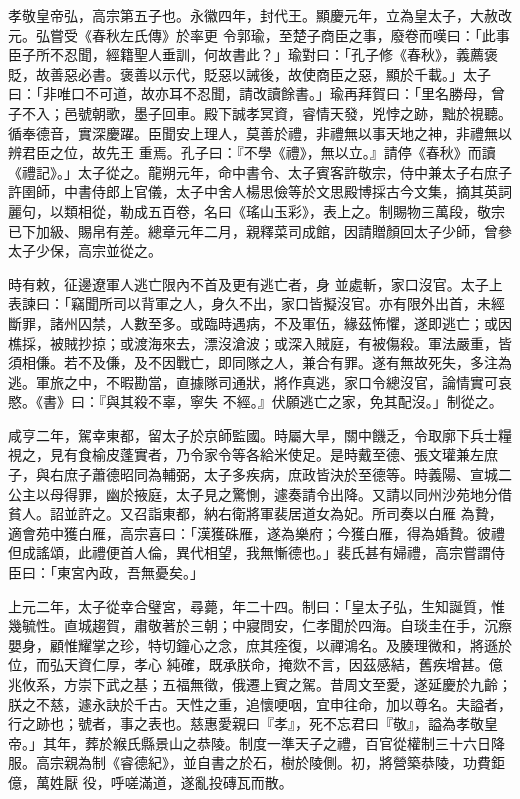 \begin{pinyinscope}
 孝敬皇帝弘，高宗第五子也。永徽四年，封代王。顯慶元年，立為皇太子，大赦改元。弘嘗受《春秋左氏傳》於率更
 令郭瑜，至楚子商臣之事，廢卷而嘆曰：「此事臣子所不忍聞，經籍聖人垂訓，何故書此？」瑜對曰：「孔子修《春秋》，義薦褒貶，故善惡必書。褒善以示代，貶惡以誡後，故使商臣之惡，顯於千載。」太子曰：「非唯口不可道，故亦耳不忍聞，請改讀餘書。」瑜再拜賀曰：「里名勝母，曾子不入；邑號朝歌，墨子回車。殿下誠孝冥資，睿情天發，兇悖之跡，黜於視聽。循奉德音，實深慶躍。臣聞安上理人，莫善於禮，非禮無以事天地之神，非禮無以辨君臣之位，故先王
 重焉。孔子曰：『不學《禮》，無以立。』請停《春秋》而讀《禮記》。」太子從之。龍朔元年，命中書令、太子賓客許敬宗，侍中兼太子右庶子許圉師，中書侍郎上官儀，太子中舍人楊思儉等於文思殿博採古今文集，摘其英詞麗句，以類相從，勒成五百卷，名曰《瑤山玉彩》，表上之。制賜物三萬段，敬宗已下加級、賜帛有差。總章元年二月，親釋菜司成館，因請贈顏回太子少師，曾參太子少保，高宗並從之。



 時有敕，征邊遼軍人逃亡限內不首及更有逃亡者，身
 並處斬，家口沒官。太子上表諫曰：「竊聞所司以背軍之人，身久不出，家口皆擬沒官。亦有限外出首，未經斷罪，諸州囚禁，人數至多。或臨時遇病，不及軍伍，緣茲怖懼，遂即逃亡；或因樵採，被賊抄掠；或渡海來去，漂沒滄波；或深入賊庭，有被傷殺。軍法嚴重，皆須相傔。若不及傔，及不因戰亡，即同隊之人，兼合有罪。遂有無故死失，多注為逃。軍旅之中，不暇勘當，直據隊司通狀，將作真逃，家口令總沒官，論情實可哀愍。《書》曰：『與其殺不辜，寧失
 不經。』伏願逃亡之家，免其配沒。」制從之。



 咸亨二年，駕幸東都，留太子於京師監國。時屬大旱，關中饑乏，令取廓下兵士糧視之，見有食榆皮蓬實者，乃令家令等各給米使足。是時戴至德、張文瓘兼左庶子，與右庶子蕭德昭同為輔弼，太子多疾病，庶政皆決於至德等。時義陽、宣城二公主以母得罪，幽於掖庭，太子見之驚惻，遽奏請令出降。又請以同州沙苑地分借貧人。詔並許之。又召詣東都，納右衛將軍裴居道女為妃。所司奏以白雁
 為贄，適會苑中獲白雁，高宗喜曰：「漢獲硃雁，遂為樂府；今獲白雁，得為婚贄。彼禮但成謠頌，此禮便首人倫，異代相望，我無慚德也。」裴氏甚有婦禮，高宗嘗謂侍臣曰：「東宮內政，吾無憂矣。」



 上元二年，太子從幸合璧宮，尋薨，年二十四。制曰：「皇太子弘，生知誕質，惟幾毓性。直城趨賀，肅敬著於三朝；中寢問安，仁孝聞於四海。自琰圭在手，沉瘵嬰身，顧惟耀掌之珍，特切鐘心之念，庶其痊復，以禪鴻名。及腠理微和，將遜於位，而弘天資仁厚，孝心
 純確，既承朕命，掩欻不言，因茲感結，舊疾增甚。億兆攸系，方崇下武之基；五福無徵，俄遷上賓之駕。昔周文至愛，遂延慶於九齡；朕之不慈，遽永訣於千古。天性之重，追懷哽咽，宜申往命，加以尊名。夫謚者，行之跡也；號者，事之表也。慈惠愛親曰『孝』，死不忘君曰『敬』，謚為孝敬皇帝。」其年，葬於緱氏縣景山之恭陵。制度一準天子之禮，百官從權制三十六日降服。高宗親為制《睿德紀》，並自書之於石，樹於陵側。初，將營築恭陵，功費鉅億，萬姓厭
 役，呼嗟滿道，遂亂投磚瓦而散。




\end{pinyinscope}
